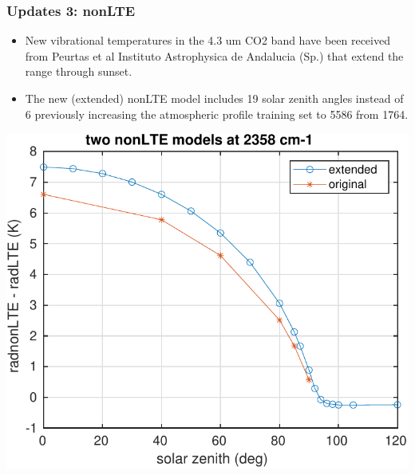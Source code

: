 \documentclass[10pt,t]{beamer}
\begin{document}
\begin{frame}
  \frametitle{Updates 3: nonLTE}
  \begin{itemize}
  \item New vibrational temperatures in the 4.3 um CO2 band have been received from Peurtas et al
    Instituto Astrophysica de Andalucia (Sp.) that extend the range through sunset.
  \item The new (extended) nonLTE model includes 19 solar zenith angles instead of 6 previously
    increasing the atmospheric profile training set to 5586 from 1764.
  \end{itemize}

  \begin{center}
    \includegraphics[width=0.5\linewidth]{./Figs/two_nlte_models_2358cm_vs_solzen.pdf}
  \end{center}
\end{frame}
\end{document}
